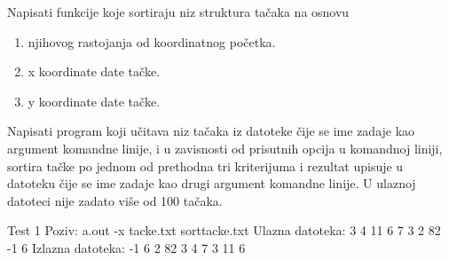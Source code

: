\begin{Exercise}[label=507]
  Napisati funkcije koje sortiraju niz struktura tačaka na
  osnovu
\begin{enumerate}
\item njihovog rastojanja od koordinatnog početka.
\item x koordinate date tačke.
\item y koordinate date tačke.
\end{enumerate}
Napisati program koji učitava niz tačaka iz datoteke čije
se ime zadaje kao argument komandne linije, i u zavisnosti od
prisutnih opcija u komandnoj liniji, sortira tačke po jednom od
prethodna tri kriterijuma i rezultat upisuje u datoteku čije se
ime zadaje kao drugi argument komandne linije. U ulaznoj datoteci nije
zadato više od 100 tačaka.
  
\begin{miditest}
\begin{test}{Test 1}
Poziv:  a.out -x tacke.txt sorttacke.txt
Ulazna datoteka:   3 4
11 6
7 3
2 82
-1 6
Izlazna datoteka:  -1 6
2 82
3 4
7 3
11 6
\end{test}
\end{miditest}
  
\end{Exercise}

